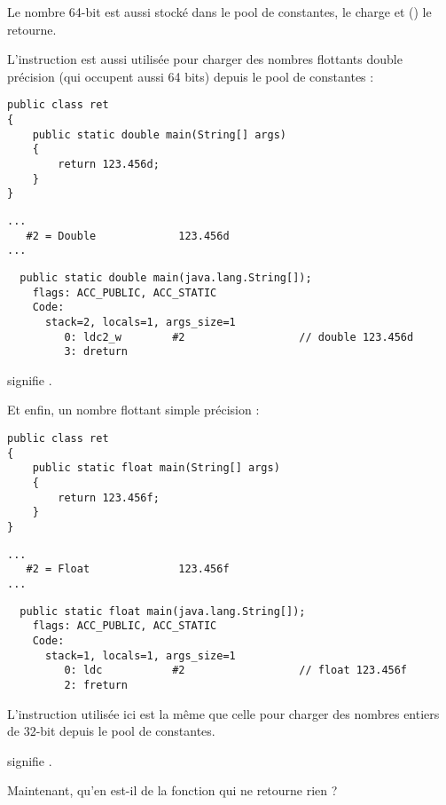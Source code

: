 Le nombre 64-bit est aussi stocké dans le pool de constantes,  le charge et  
() le retourne.

L'instruction  est aussi utilisée pour charger des nombres flottants double précision 
(qui occupent aussi 64 bits) depuis le pool de constantes :

\begin{lstlisting}[style=customjava]
public class ret
{
	public static double main(String[] args)
	{
		return 123.456d;
	}
}
\end{lstlisting}

\begin{lstlisting}[caption=Constant pool]
...
   #2 = Double             123.456d
...
\end{lstlisting}

\begin{lstlisting}
  public static double main(java.lang.String[]);
    flags: ACC_PUBLIC, ACC_STATIC
    Code:
      stack=2, locals=1, args_size=1
         0: ldc2_w        #2                  // double 123.456d
         3: dreturn       
\end{lstlisting}

 signifie .

Et enfin, un nombre flottant simple précision :

\begin{lstlisting}[style=customjava]
public class ret
{
	public static float main(String[] args)
	{
		return 123.456f;
	}
}
\end{lstlisting}

\begin{lstlisting}[caption=Constant pool]
...
   #2 = Float              123.456f
...
\end{lstlisting}

\begin{lstlisting}
  public static float main(java.lang.String[]);
    flags: ACC_PUBLIC, ACC_STATIC
    Code:
      stack=1, locals=1, args_size=1
         0: ldc           #2                  // float 123.456f
         2: freturn       
\end{lstlisting}

L'instruction  utilisée ici est la même que celle pour charger des nombres entiers de 32-bit
depuis le pool de constantes.

 signifie .

Maintenant, qu'en est-il de la fonction qui ne retourne rien ?

